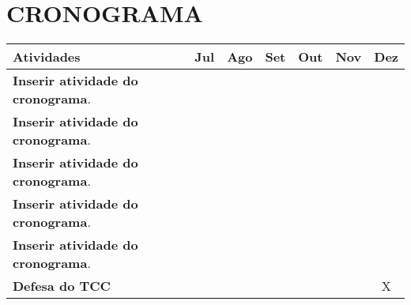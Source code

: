 \newpage

\section{CRONOGRAMA}
\label{sec:cronograma}


\begin{center}
	\begin{tabular}{ |p{8cm}|c|c|c|c|c|c| }
		\hline
		\textbf{Atividades} & \textbf{Jul} & \textbf{Ago} & \textbf{Set} & \textbf{Out} & \textbf{Nov} & \textbf{Dez} \\
		\hline
		\textbf{Inserir atividade do cronograma}. &  &  &  &  &  &   \\
		\hline
		\textbf{Inserir atividade do cronograma}. &  &  &  &  &  &   \\
		\hline
		\textbf{Inserir atividade do cronograma}. &  &  &  &  &  &  \\
		\hline
		\textbf{Inserir atividade do cronograma}. &  &  &  &  &  & \\
		\hline
		\textbf{Inserir atividade do cronograma}. &  &  &  &  &  &\\
		\hline
		\textbf{Defesa do TCC} &  &  &  &  &  & X \\
		\hline
	\end{tabular}
\end{center}
